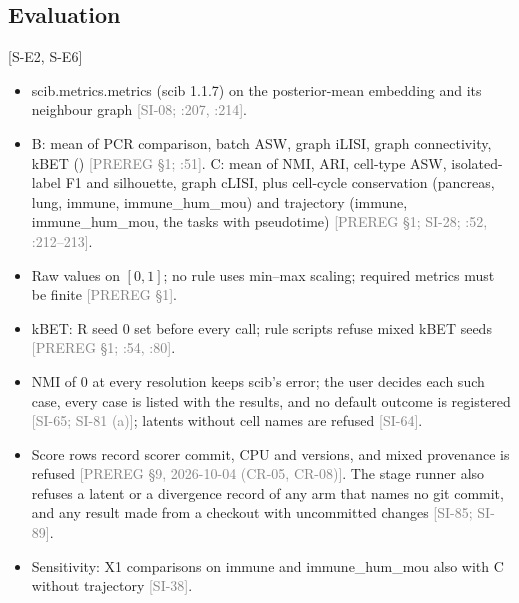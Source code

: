 \documentclass[11pt]{article}
\newcommand{\src}[1]{{\scriptsize\textcolor{gray}{[#1]}}}
\begin{document}
\subsection{Evaluation}
[S-E2, S-E6]
\begin{itemize}
\item scib.metrics.metrics (scib 1.1.7) on the posterior-mean embedding and its neighbour graph \src{SI-08; :207, :214}.
\item B: mean of PCR comparison, batch ASW, graph iLISI, graph connectivity, kBET (\citealp{buttner2019test}) \src{PREREG \S1; :51}. C: mean of NMI, ARI, cell-type ASW, isolated-label F1 and silhouette, graph cLISI, plus cell-cycle conservation (pancreas, lung, immune, immune\_hum\_mou) and trajectory (immune, immune\_hum\_mou, the tasks with pseudotime) \src{PREREG \S1; SI-28; :52, :212--213}.
\item Raw values on $[0, 1]$; no rule uses min--max scaling; required metrics must be finite \src{PREREG \S1}.
\item kBET: R seed 0 set before every call; rule scripts refuse mixed kBET seeds \src{PREREG \S1; :54, :80}.
\item NMI of 0 at every resolution keeps scib's error; the user decides each such case, every case is listed with the results, and no default outcome is registered \src{SI-65; SI-81 (a)}; latents without cell names are refused \src{SI-64}.
\item Score rows record scorer commit, CPU and versions, and mixed provenance is refused \src{PREREG \S9, 2026-10-04 (CR-05, CR-08)}. The stage runner also refuses a latent or a divergence record of any arm that names no git commit, and any result made from a checkout with uncommitted changes \src{SI-85; SI-89}.
\item Sensitivity: X1 comparisons on immune and immune\_hum\_mou also with C without trajectory \src{SI-38}.
\end{itemize}
\end{document}
